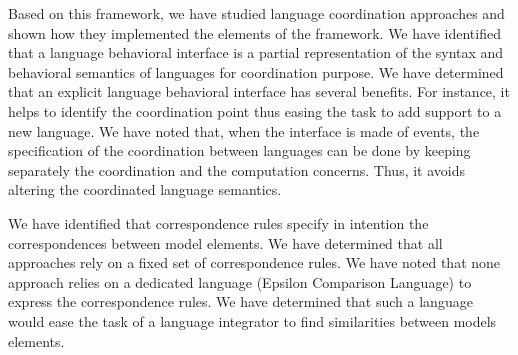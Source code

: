 Based on this framework, we have studied language coordination approaches and shown how they implemented the elements of the framework. We have identified that a language behavioral interface is a partial representation of the syntax and behavioral semantics of languages for coordination purpose. We have determined that an explicit language behavioral interface has several benefits. For instance, it helps to identify the coordination point thus easing the task to add support to a new language. We have noted that, when the interface is made of events, the specification of the coordination between languages can be done by keeping separately the coordination and the computation concerns. Thus, it avoids altering the coordinated language semantics.


We have identified that correspondence rules specify in intention the correspondences between model elements. We have determined that all approaches rely on a fixed set of correspondence rules. We have noted that none approach relies on a dedicated language (\eg Epsilon Comparison Language) to express the correspondence rules. We have determined that such a language would ease the task of a language integrator to find similarities between models elements.  

